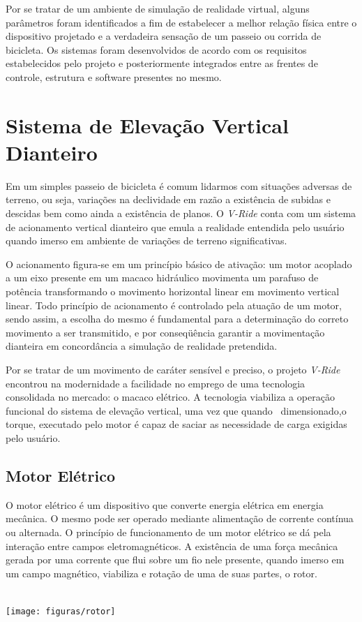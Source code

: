 Por se tratar de um ambiente de simulação de realidade virtual, alguns parâmetros foram identificados a fim de estabelecer a melhor relação física entre o dispositivo projetado e a verdadeira sensação de um passeio ou corrida de bicicleta. Os sistemas foram desenvolvidos de acordo com os requisitos estabelecidos pelo projeto e posteriormente integrados entre as frentes de controle, estrutura e software presentes no mesmo.

\section{Sistema de Elevação Vertical Dianteiro}

Em um simples passeio de bicicleta é comum lidarmos com situações adversas de terreno, ou seja, variações na declividade em razão a existência de subidas e descidas bem como ainda a existência de planos. O \textit{V-Ride} conta com um sistema de acionamento vertical dianteiro que emula a realidade entendida pelo usuário quando imerso em ambiente de variações de terreno significativas. 

O acionamento figura-se em um princípio básico de ativação: um motor acoplado a um eixo presente em um macaco hidráulico movimenta um parafuso de potência transformando o movimento horizontal linear em movimento vertical linear. Todo princípio de acionamento é controlado pela atuação de um motor, sendo assim, a escolha do mesmo é fundamental para a determinação do correto movimento a ser transmitido, e por conseqüência garantir a movimentação dianteira em concordância a simulação de realidade pretendida. 

Por se tratar de um movimento de caráter sensível e preciso, o projeto \textit{V-Ride} encontrou na modernidade a facilidade no emprego de uma tecnologia consolidada no mercado: o macaco elétrico. A tecnologia viabiliza a operação funcional do sistema de elevação vertical, uma vez que quando  dimensionado,o torque, executado pelo motor é capaz de saciar as necessidade de carga exigidas pelo usuário.

\subsection{Motor Elétrico}

O motor elétrico é um dispositivo que converte energia elétrica em energia mecânica. O mesmo pode ser operado mediante alimentação de corrente contínua ou alternada. O princípio de funcionamento de um motor elétrico se dá pela interação entre campos eletromagnéticos. A existência de uma força mecânica gerada por uma corrente que flui sobre um fio nele presente, quando imerso em um campo magnético, viabiliza e rotação de uma de suas partes, o rotor. 
                
\begin{center}
\texttt{[image: figuras/rotor]}
\label{rotor}
\end{center}

